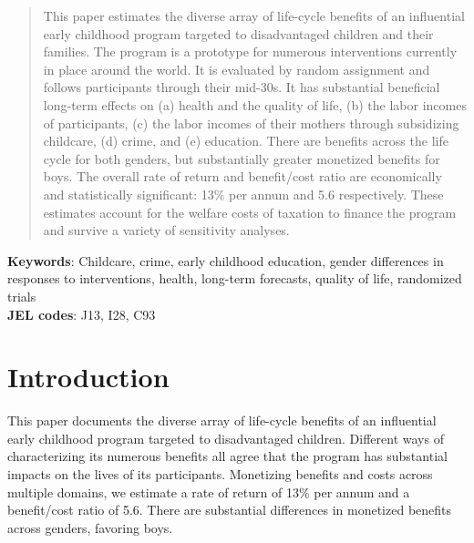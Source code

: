 \begin{titlepage}
\maketitle

\end{titlepage}

\singlespacing

\begin{abstract}
This paper estimates the diverse array of life-cycle benefits of an influential early childhood program targeted to disadvantaged children and their families. The program is a prototype for numerous interventions currently in place around the world. It is evaluated by random assignment and follows participants through their mid-30s. It has substantial beneficial long-term effects on (a) health and the quality of life, (b) the labor incomes of participants, (c) the labor incomes of their mothers through subsidizing childcare, (d) crime, and (e) education. There are benefits across the life cycle for both genders, but substantially greater monetized benefits for boys. The overall rate of return and benefit/cost ratio are economically and statistically significant: 13\% per annum and 5.6 respectively. These estimates account for the welfare costs of taxation to finance the program and survive a variety of sensitivity analyses.
\end{abstract}

\noindent \textbf{Keywords}: Childcare, crime, early childhood education, gender differences in responses to interventions, health, long-term forecasts, quality of life, randomized trials \\
\noindent \textbf{JEL codes}: J13, I28, C93


\tableofcontents

\clearpage
\doublespacing

\setcounter{page}{0}

\section{Introduction}

This paper documents the diverse array of life-cycle benefits of an influential early childhood program targeted to disadvantaged children. Different ways of characterizing its numerous benefits all agree that the program has substantial impacts on the lives of its participants. Monetizing benefits and costs across multiple domains, we estimate a rate of return of 13\% per annum and a benefit/cost ratio of 5.6. There are substantial differences in monetized benefits across genders, favoring boys.

